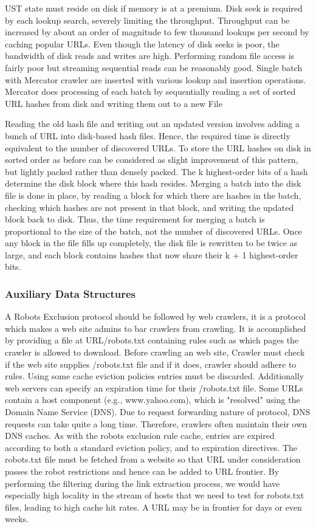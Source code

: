 \documentclass[article,type=msc,colorback,accentcolor=tud9c,twoside,11pt]{tudthesis}
\begin{document}
UST state must reside on disk if memory is at a premium. Disk seek is required by each lookup search, severely limiting the throughput. Throughput can be increased by about an order of magnitude\cite{Graphstructure} to few thousand lookups per second by caching popular URLs. Even though the latency of disk seeks is poor, the bandwidth of disk reads and writes are high. Performing random file access is fairly poor but streaming sequential reads can be reasonably good. Single batch with Mercator crawler are inserted with various lookup and insertion operations. Mercator does processing of each batch by sequentially reading a set of sorted URL hashes from disk and writing them out to a new File\cite{Highperformancewebcrawling}

Reading the old hash file and writing out an updated version involves adding a bunch of URL into disk-based hash files. Hence, the required time is directly equivalent to the number of discovered URLs. To store the URL hashes on disk in sorted order as before can be considered as slight improvement of this pattern, but lightly packed rather than densely packed. The k highest-order bits of a hash determine the disk block where this hash resides. Merging a batch into the disk file is done in place, by reading a block for which there are hashes in the batch, checking which hashes are not present in that block, and writing the updated block back to disk. Thus, the time requirement for merging a batch is proportional to the size of the batch, not the number of discovered URLs. Once any block in the file fills up completely, the disk file is rewritten to be twice as large, and each block contains hashes that now share their k + 1 highest-order bits.

\subsubsection{Auxiliary Data Structures}
A Robots Exclusion protocol should be followed by web crawlers, it is a protocol which makes a web site admins to bar crawlers from crawling. It is accomplished by providing a file at URL/robots.txt containing rules such as which pages the crawler is allowed to download. Before crawling an web site, Crawler must check if the web site supplies /robots.txt file and if it does, crawler should adhere to rules. Using some cache eviction policies entries must be discarded. Additionally web servers can specify an expiration time for their /robots.txt file. Some URLs contain a host component (e.g., www.yahoo.com), which is "resolved" using the Domain Name Service (DNS). Due to request forwarding nature of protocol, DNS requests can take quite a long time. Therefore, crawlers often maintain their own DNS caches. As with the robots exclusion rule cache, entries are expired according to both a standard eviction policy, and to expiration directives. The robots.txt file must be fetched from a website so that URL under consideration passes the robot restrictions and hence can be added to URL frontier. By performing the filtering during the link extraction process, we would have especially high locality in the stream of hosts that we need to test for robots.txt files, leading to high cache hit rates. A URL may be in frontier for days or even weeks.
 
\end{document}
